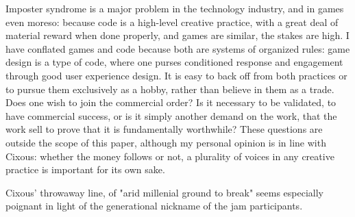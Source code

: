 Imposter syndrome is a major problem in the technology industry, and in games even moreso: because code is a high-level creative practice, with a great deal of material reward when done properly, and games are similar, the stakes are high. I have conflated games and code because both are systems of organized rules: game design is a type of code, where one purses conditioned response and engagement through good user experience design. It is easy to back off from both practices or to pursue them exclusively as a hobby, rather than believe in them as a trade. Does one wish to join the commercial order? Is it necessary to be validated, to have commercial success, or is it simply another demand on the work, that the work sell to prove that it is fundamentally worthwhile? These questions are outside the scope of this paper, although my personal opinion is in line with Cixous: whether the money follows or not, a plurality of voices in any creative practice is important for its own sake.

Cixous' throwaway line, of "arid millenial ground to break" seems especially poignant in light of the generational nickname of the jam participants. 
